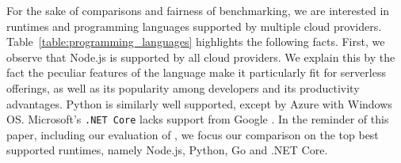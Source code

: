 For the sake of comparisons and fairness of benchmarking, we are interested in runtimes and programming languages supported by multiple cloud providers.  
Table~\ref{table:programming_languages} highlights the following facts.
First, we observe that Node.js is supported by all cloud providers.
We explain this by the fact the peculiar features of the language make it particularly fit for serverless offerings, as well as its popularity among developers and its productivity advantages.
Python is similarly well supported, except by Azure with Windows \gls{OS}. %
Microsoft's \texttt{.NET Core} lacks support from Google . 
In the reminder of this paper, including our evaluation of \sys, we focus our comparison on the top best supported runtimes, namely Node.js, Python, Go and .NET Core. 

